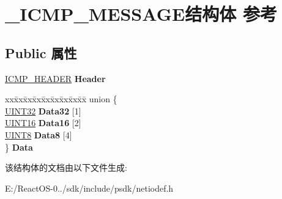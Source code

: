 \hypertarget{struct___i_c_m_p___m_e_s_s_a_g_e}{}\section{\+\_\+\+I\+C\+M\+P\+\_\+\+M\+E\+S\+S\+A\+G\+E结构体 参考}
\label{struct___i_c_m_p___m_e_s_s_a_g_e}
\subsection*{Public 属性}
\begin{DoxyCompactItemize}
\item 
\mbox{\label{struct___i_c_m_p___m_e_s_s_a_g_e_a5745a871f5b1a4298ad003aa872e7eb0}} 
\hyperlink{struct_i_c_m_p___h_e_a_d_e_r}{I\+C\+M\+P\+\_\+\+H\+E\+A\+D\+ER} {\bfseries Header}
\item 
\mbox{\label{struct___i_c_m_p___m_e_s_s_a_g_e_ac075d2b804123718fddd94a31be50333}} 
\begin{tabbing}
xx\=xx\=xx\=xx\=xx\=xx\=xx\=xx\=xx\=\kill
union \{\\
\>\hyperlink{_processor_bind_8h_ae1e6edbbc26d6fbc71a90190d0266018}{UINT32} {\bfseries Data32} \mbox{[}1\mbox{]}\\
\>\hyperlink{_processor_bind_8h_a09f1a1fb2293e33483cc8d44aefb1eb1}{UINT16} {\bfseries Data16} \mbox{[}2\mbox{]}\\
\>\hyperlink{_processor_bind_8h_ab27e9918b538ce9d8ca692479b375b6a}{UINT8} {\bfseries Data8} \mbox{[}4\mbox{]}\\
\} {\bfseries Data}\\

\end{tabbing}\end{DoxyCompactItemize}


该结构体的文档由以下文件生成\+:\begin{DoxyCompactItemize}
\item 
E\+:/\+React\+O\+S-\/0../sdk/include/psdk/netiodef.\+h\end{DoxyCompactItemize}
